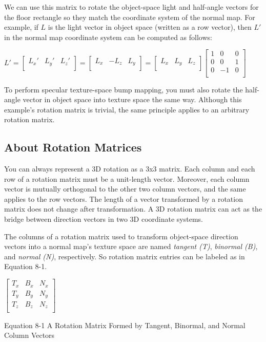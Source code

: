 \documentclass[../main.tex]{subfiles}
\begin{document}
We can use this matrix to rotate the object-space light and half-angle vectors for the floor rectangle so they match the coordinate system of the normal map. For example, if $L$ is the light vector in object space (written as a row vector), then $L'$ in the normal map coordinate system can be computed as follows:

$
L'
=
\begin{bmatrix} L_x' & L_y' & L_z' \\ \end{bmatrix}
=
\begin{bmatrix} L_x & -L_z & L_y \\ \end{bmatrix}
=
\begin{bmatrix} L_x & L_y & L_z \\ \end{bmatrix}
\begin{bmatrix} 1 & 0 & 0 \\ 0 & 0 & 1 \\ 0 & -1 & 0 \\ \end{bmatrix}
$

To perform specular texture-space bump mapping, you must also rotate the half-angle vector in object space into texture space the same way. Although this example's rotation matrix is trivial, the same principle applies to an arbitrary rotation matrix.

\subsection*{About Rotation Matrices}

You can always represent a 3D rotation as a 3x3 matrix. Each column and each row of a rotation matrix must be a unit-length vector. Moreover, each column vector is mutually orthogonal to the other two column vectors, and the same applies to the row vectors. The length of a vector transformed by a rotation matrix does not change after transformation. A 3D rotation matrix can act as the bridge between direction vectors in two 3D coordinate systems.

The columns of a rotation matrix used to transform object-space direction vectors into a normal map's texture space are named \textit{tangent (T)}, \textit{binormal (B)}, and \textit{normal (N)}, respectively. So rotation matrix entries can be labeled as in Equation 8-1.

\FloatBarrier
\begin{equationcaption}
$
\begin{bmatrix}
T_x & B_x & N_x \\
T_y & B_y & N_y \\
T_z & B_z & N_z \\
\end{bmatrix}
$
\caption{Equation 8-1 A Rotation Matrix Formed by Tangent, Binormal, and Normal Column Vectors}
\end{equationcaption}
\FloatBarrier
\end{document}
